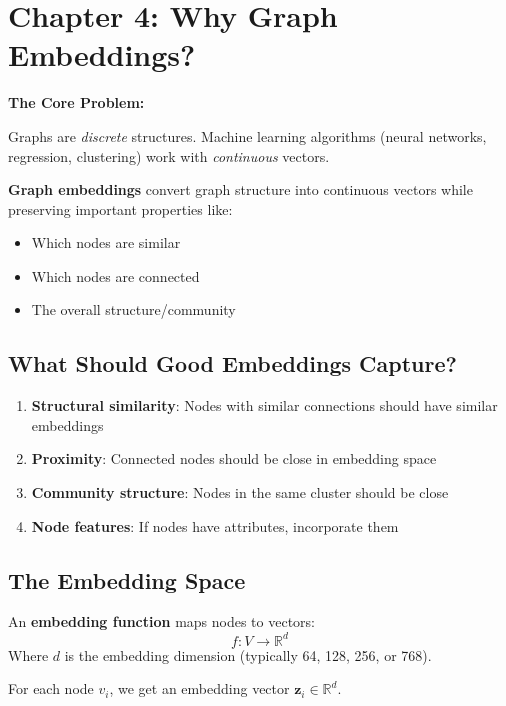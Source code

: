 \documentclass[12pt,a4paper]{article}
\begin{document}
\section{Chapter 4: Why Graph Embeddings?}

\begin{concept}
\textbf{The Core Problem:}

Graphs are \textit{discrete} structures. Machine learning algorithms (neural networks, regression, clustering) work with \textit{continuous} vectors.

\textbf{Graph embeddings} convert graph structure into continuous vectors while preserving important properties like:
\begin{itemize}
    \item Which nodes are similar
    \item Which nodes are connected
    \item The overall structure/community
\end{itemize}
\end{concept}

\subsection{What Should Good Embeddings Capture?}

\begin{enumerate}
    \item \textbf{Structural similarity}: Nodes with similar connections should have similar embeddings
    \item \textbf{Proximity}: Connected nodes should be close in embedding space
    \item \textbf{Community structure}: Nodes in the same cluster should be close
    \item \textbf{Node features}: If nodes have attributes, incorporate them
\end{enumerate}

\subsection{The Embedding Space}

\begin{mathbox}
An \textbf{embedding function} maps nodes to vectors:
\[
f: V \rightarrow \mathbb{R}^d
\]
Where $d$ is the embedding dimension (typically 64, 128, 256, or 768).

For each node $v_i$, we get an embedding vector $\mathbf{z}_i \in \mathbb{R}^d$.
\end{mathbox}
\end{document}
